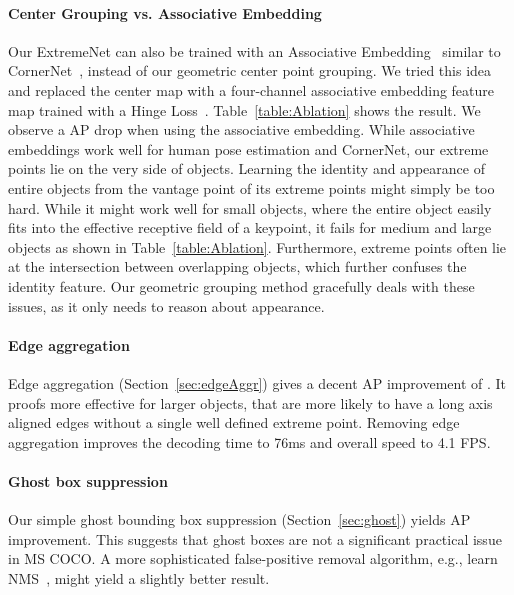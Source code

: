 \documentclass[10pt,twocolumn,letterpaper]{article}
\begin{document}
\paragraph{Center Grouping vs. Associative Embedding}
Our ExtremeNet can also be trained with an Associative Embedding~\cite{newell2017associative} similar to CornerNet~\cite{Law_2018_ECCV}, instead of our geometric center point grouping.
We tried this idea and replaced the center map with a four-channel associative embedding feature map trained with a Hinge Loss~\cite{Law_2018_ECCV}.
Table~\ref{table:Ablation} shows the result.
We observe a  AP drop when using the associative embedding.
While associative embeddings work well for human pose estimation and CornerNet, our extreme points lie on the very side of objects.
Learning the identity and appearance of entire objects from the vantage point of its extreme points might simply be too hard.
While it might work well for small objects, where the entire object easily fits into the effective receptive field of a keypoint, it fails for medium and large objects as shown in Table~\ref{table:Ablation}.
Furthermore, extreme points often lie at the intersection between overlapping objects, which further confuses the identity feature.
Our geometric grouping method gracefully deals with these issues, as it only needs to reason about appearance.

\paragraph{Edge aggregation}
Edge aggregation (Section~\ref{sec:edgeAggr}) gives a decent AP improvement of .
It proofs more effective for larger objects, that are more likely to have a long axis aligned edges without a single well defined extreme point.
Removing edge aggregation improves the decoding time to 76ms and overall speed to 4.1 FPS.

\paragraph{Ghost box suppression}
Our simple ghost bounding box suppression (Section~\ref{sec:ghost}) yields  AP improvement.
This suggests that ghost boxes are not a significant practical issue in MS COCO.
A more sophisticated false-positive removal algorithm, e.g., learn NMS~\cite{hosang2017learning}, might yield a slightly better result.
\end{document}
